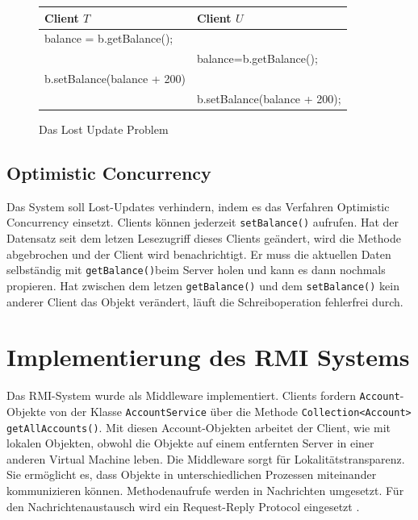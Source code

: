 \begin{figure}[h]
  \centering

\begin{tabular}{l | l}
  \textbf{Client $T$} & \textbf{Client $U$} \\ \hline
balance = b.getBalance(); &  \\
 & balance=b.getBalance();  \\
b.setBalance(balance + 200) & \\
& b.setBalance(balance + 200);  \\ \hline
\end{tabular}
    
  \caption{Das Lost Update Problem}
  \label{fig:lostupdate}
\end{figure}

\subsection{Optimistic Concurrency}
\label{sec:optim-conc}

Das System soll Lost-Updates verhindern, indem es das Verfahren
Optimistic Concurrency \cite{wiki:optimistic-concurrency} einsetzt. Clients
können jederzeit \verb|setBalance()| aufrufen. Hat der Datensatz seit
dem letzen Lesezugriff dieses Clients geändert, wird die Methode
abgebrochen und der Client wird benachrichtigt. Er muss die aktuellen Daten
selbständig mit \verb|getBalance()|beim Server holen und kann es dann
nochmals propieren. Hat zwischen dem letzen \texttt{getBalance()} und
dem \texttt{setBalance()} kein anderer Client das Objekt verändert,
läuft die Schreiboperation fehlerfrei durch.

\section{Implementierung des RMI Systems}
\label{sec:impl-des-eigen}

Das RMI-System wurde als Middleware implementiert. Clients fordern \newline
\texttt{Ac\-co\-unt}\--Objekte von der Klasse \texttt{AccountService} über die
Methode \newline \texttt{Collection<Account> getAllAccounts()}. Mit diesen
Account-Ob\-jek\-ten\- arbeitet der Client, wie mit lokalen Objekten, obwohl
die Objekte auf einem entfernten Server in einer anderen Virtual
Machine leben. Die
Middleware sorgt für Lokalitätstransparenz. Sie 
ermöglicht es, dass Objekte in unterschiedlichen Prozessen miteinander
kommunizieren können. Methodenaufrufe werden in Nachrichten umgesetzt.
Für den Nachrichtenaustausch wird ein Request-Reply Protocol eingesetzt \cite{coulouris88}.

